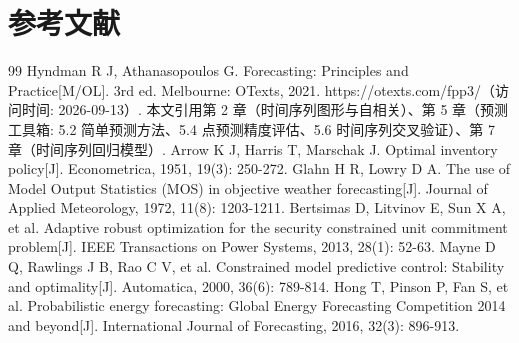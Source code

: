 \section{参考文献}
\renewcommand{\refname}{}%
\begin{thebibliography}{99}
 Hyndman R J, Athanasopoulos G. Forecasting: Principles and Practice[M/OL]. 3rd ed. Melbourne: OTexts, 2021. https://otexts.com/fpp3/（访问时间: 2026-09-13）. 本文引用第 2 章（时间序列图形与自相关）、第 5 章（预测工具箱: 5.2 简单预测方法、5.4 点预测精度评估、5.6 时间序列交叉验证）、第 7 章（时间序列回归模型）.
 Arrow K J, Harris T, Marschak J. Optimal inventory policy[J]. Econometrica, 1951, 19(3): 250-272.
 Glahn H R, Lowry D A. The use of Model Output Statistics (MOS) in objective weather forecasting[J]. Journal of Applied Meteorology, 1972, 11(8): 1203-1211.
 Bertsimas D, Litvinov E, Sun X A, et al. Adaptive robust optimization for the security constrained unit commitment problem[J]. IEEE Transactions on Power Systems, 2013, 28(1): 52-63.
 Mayne D Q, Rawlings J B, Rao C V, et al. Constrained model predictive control: Stability and optimality[J]. Automatica, 2000, 36(6): 789-814.
 Hong T, Pinson P, Fan S, et al. Probabilistic energy forecasting: Global Energy Forecasting Competition 2014 and beyond[J]. International Journal of Forecasting, 2016, 32(3): 896-913.
\end{thebibliography}
